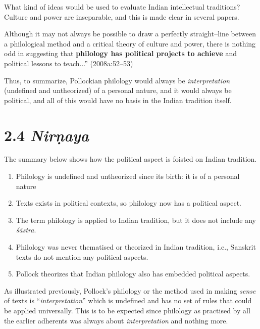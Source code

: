 What kind of ideas would be used to evaluate Indian intellectual traditions? Culture and power are inseparable, and this is made clear in several papers.

\begin{myquote}
Although it may not always be possible to draw a perfectly straight–line between a philological method and a critical theory of culture and power, there is nothing odd in suggesting that \textbf{philology has political projects to achieve} and political lessons to teach...” (2008a:52–53)
\end{myquote}

Thus, to summarize, Pollockian philology would always be \textit{interpretation} (undefined and untheorized) of a personal nature, and it would always be political, and all of this would have no basis in the Indian tradition itself.


\section*{2.4 {\it {\bfseries Nirṇaya}}}

The summary below shows how the political aspect is foisted on Indian tradition.

\begin{enumerate}
\itemsep=0pt
\item Philology is undefined and untheorized since its birth: it is of a personal nature

 \item Texts exists in political contexts, so philology now has a political aspect.

 \item The term philology is applied to Indian tradition, but it does not include any\textit{ śāstra}.

 \item Philology was never thematised or theorized in Indian tradition, i.e., Sanskrit texts do not mention any political aspects.

 \item Pollock theorizes that Indian philology also has embedded political aspects.

\end{enumerate}

As illustrated previously, Pollock’s philology or the method used in making \textit{sense} of texts is “\textit{interpretation}” which is undefined and has no set of rules that could be applied universally. This is to be expected since philology as practised by all the earlier adherents was always about \textit{interpretation} and nothing more.

